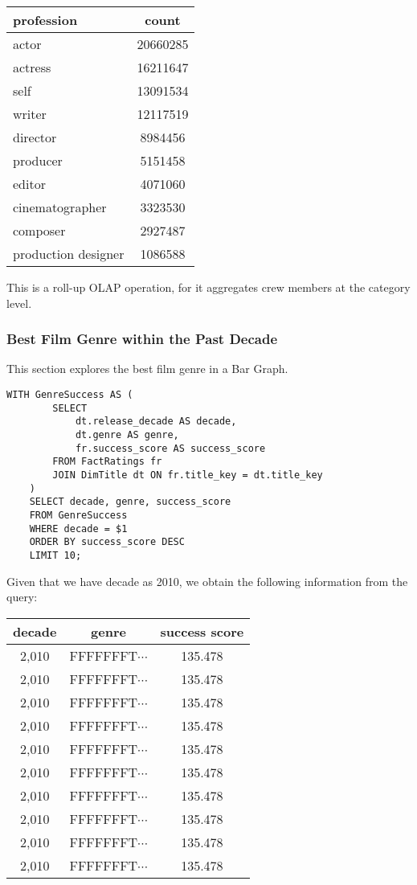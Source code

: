 \begin{center}
	\begin{tabular}{|p{4cm}|c|}
		\hline
		profession & count\\
		\hline
		actor & 20660285 \\
		actress & 16211647 \\
		self & 13091534 \\ 
		writer & 12117519 \\
		director & 8984456 \\
		producer & 5151458 \\
		editor & 4071060 \\
		cinematographer & 3323530 \\
		composer & 2927487 \\
		production designer & 1086588 \\
		\hline
	\end{tabular}
\end{center}

This is a roll-up OLAP operation, for it aggregates crew members at the category level.

\subsubsection{Best Film Genre within the Past Decade}

This section explores the best film genre in a Bar Graph.
\begin{lstlisting}[style=SQLStyle]
	WITH GenreSuccess AS (
		SELECT
			dt.release_decade AS decade,
			dt.genre AS genre,
			fr.success_score AS success_score
		FROM FactRatings fr
		JOIN DimTitle dt ON fr.title_key = dt.title_key
	)
	SELECT decade, genre, success_score
	FROM GenreSuccess
	WHERE decade = $1
	ORDER BY success_score DESC
	LIMIT 10;
\end{lstlisting}

Given that we have decade as 2010, we obtain the following information from the query:

\begin{center}
	\begin{tabular}{|c|c|c|}
\hline
decade & genre & success score\\
\hline
2,010 & FFFFFFFT$\cdots$ & 135.478\\
2,010 & FFFFFFFT$\cdots$ & 135.478\\
2,010 & FFFFFFFT$\cdots$ & 135.478\\
2,010 & FFFFFFFT$\cdots$ & 135.478\\
2,010 & FFFFFFFT$\cdots$ & 135.478\\
2,010 & FFFFFFFT$\cdots$ & 135.478\\
2,010 & FFFFFFFT$\cdots$ & 135.478\\
2,010 & FFFFFFFT$\cdots$ & 135.478\\
2,010 & FFFFFFFT$\cdots$ & 135.478\\
2,010 & FFFFFFFT$\cdots$ & 135.478\\
\hline
\end{tabular}
\end{center}

